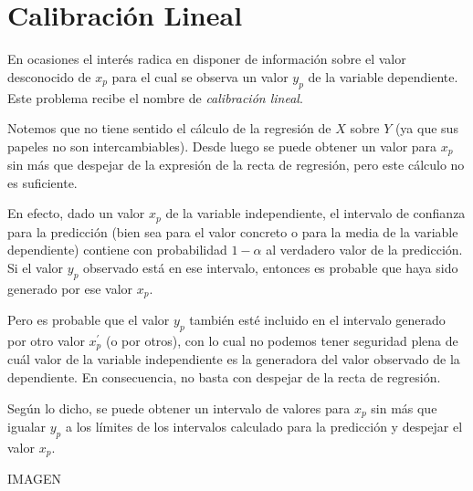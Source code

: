 \documentclass[10pt,a4paper]{book}
\begin{document}
	\section{Calibración Lineal}
En ocasiones el interés radica en disponer de información sobre el valor desconocido de $x_p$ para el cual se observa un valor $y_p$ de la variable dependiente. Este problema recibe el nombre de \textit{calibración lineal}.

Notemos que no tiene sentido el cálculo de la regresión de $X$ sobre $Y$ (ya que sus papeles no son intercambiables). Desde luego se puede obtener un valor para $x_p$ sin más que despejar de la expresión de la recta de regresión, pero este cálculo no es suficiente.

En efecto, dado un valor $x_p$ de la variable independiente, el intervalo de confianza para la predicción (bien sea para el valor concreto o para la media de la variable dependiente) contiene con probabilidad $1-\alpha$ al verdadero valor de la predicción. Si el valor $y_p$ observado está en ese intervalo, entonces es probable que haya sido generado por ese valor $x_p$.

Pero es probable que el valor $y_p$ también esté incluido en el intervalo generado por otro valor $x^\mathrm{'}_p$ (o por otros), con lo cual no podemos tener seguridad plena de cuál valor de la variable independiente es la generadora del valor observado de la dependiente. En consecuencia, no basta con despejar de la recta de regresión.

Según lo dicho, se puede obtener un intervalo de valores para $x_p$ sin más que igualar $y_p$ a los límites de los intervalos calculado para la predicción y despejar el valor $x_p$.

\begin{center}
IMAGEN
\end{center}
\end{document}
